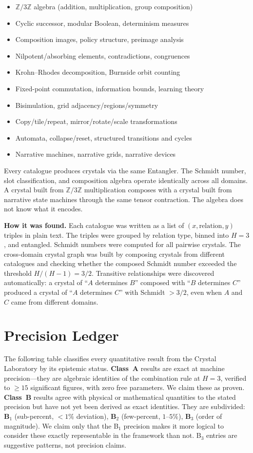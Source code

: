 \documentclass[11pt,a4paper]{article}
\theoremstyle{definition}
\theoremstyle{remark}
\newcommand{\Z}{\mathbb{Z}}
\begin{document}
\begin{itemize}[nosep]
\item $\Z/3\Z$ algebra (addition, multiplication, group composition)
\item Cyclic successor, modular Boolean, determinism measures
\item Composition images, policy structure, preimage analysis
\item Nilpotent/absorbing elements, contradictions, congruences
\item Krohn--Rhodes decomposition, Burnside orbit counting
\item Fixed-point commutation, information bounds, learning theory
\item Bisimulation, grid adjacency/regions/symmetry
\item Copy/tile/repeat, mirror/rotate/scale transformations
\item Automata, collapse/reset, structured transitions and cycles
\item Narrative machines, narrative grids, narrative devices
\end{itemize}

Every catalogue produces crystals via the same Entangler. The Schmidt number, slot classification, and composition algebra operate identically across all domains. A crystal built from $\Z/3\Z$ multiplication composes with a crystal built from narrative state machines through the same tensor contraction. The algebra does not know what it encodes.

\textbf{How it was found.} Each catalogue was written as a list of $(x, \mathrm{relation}, y)$ triples in plain text. The triples were grouped by relation type, binned into $H=3$, and entangled. Schmidt numbers were computed for all pairwise crystals. The cross-domain crystal graph was built by composing crystals from different catalogues and checking whether the composed Schmidt number exceeded the threshold $H/(H-1) = 3/2$. Transitive relationships were discovered automatically: a crystal of ``$A$ determines $B$'' composed with ``$B$ determines $C$'' produced a crystal of ``$A$ determines $C$'' with Schmidt $> 3/2$, even when $A$ and $C$ came from different domains.


\section{Precision Ledger}\label{sec:ledger}

The following table classifies every quantitative result from the Crystal Laboratory by its epistemic status. \textbf{Class~A} results are exact at machine precision---they are algebraic identities of the combination rule at $H=3$, verified to $\geq 15$ significant figures, with zero free parameters. We claim these as proven. \textbf{Class~B} results agree with physical or mathematical quantities to the stated precision but have not yet been derived as exact identities. They are subdivided: \textbf{B$_1$} (sub-percent, $<1\%$ deviation), \textbf{B$_2$} (few-percent, $1$--$5\%$), \textbf{B$_3$} (order of magnitude). We claim only that the B$_1$ precision makes it more logical to consider these exactly representable in the framework than not. B$_3$ entries are suggestive patterns, not precision claims.
\end{document}
